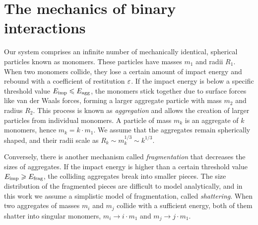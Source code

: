 \documentclass[aps,prl,preprint,groupedaddress,10pt]{revtex4-2}
\begin{document}
\section{The mechanics of binary interactions}
Our system comprises an infinite number of mechanically identical, spherical particles 
known as monomers. These particles have masses $m_1$ and radii $R_1$. When two 
monomers collide, they lose a certain amount of impact energy and rebound with a 
coefficient of restitution $\varepsilon$. If the impact energy is below a specific threshold 
value $E_{\mathrm{imp}}\leqslant E_{\mathrm{agg}}$, the monomers stick together due to surface 
forces like van der Waals forces, forming a larger aggregate particle with mass $m_2$ 
and radius $R_2$. This process is known as \emph{aggregation} and allows the creation 
of larger particles from individual monomers. A particle of mass $m_k$ is an aggregate
of $k$ monomers, hence $m_k=k\cdot m_1$. We assume that the aggregates remain 
spherically shaped, and their radii scale as $R_k\sim m_k^{1/3}\sim k^{1/3}$.

Conversely, there is another mechanism called \emph{fragmentation} that decreases the 
sizes of aggregates. If the impact energy is higher than a certain threshold value 
$E_{\mathrm{imp}}\geqslant E_{\mathrm{frag}}$, the colliding aggregates break into smaller pieces.
The size distribution of the fragmented pieces are difficult to model analytically, and
in this work we assume a simplistic model of fragmentation, called \emph{shattering}.
When two aggregates of masses $m_i$ and $m_j$ collide with a sufficient energy, both 
of them shatter into singular monomers, $m_i\to i\cdot m_1$ and $m_j\to j\cdot m_1$.
\end{document}
